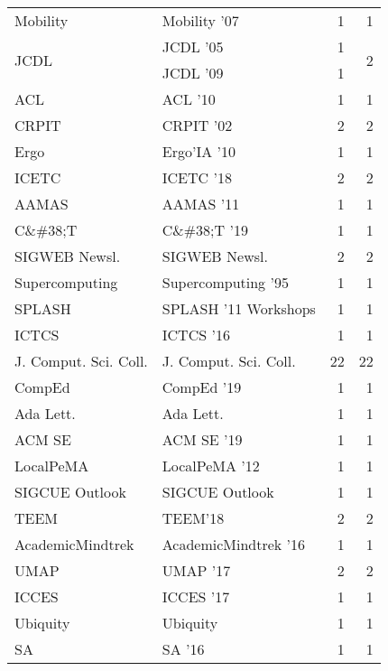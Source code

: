 \begin{table*}[t]
\begin{tabular}{llrr}
\multirow{1}{*}{Mobility } & Mobility '07 & 1 & \multirow{1}{*}{1}\\
\multirow{2}{*}{JCDL } & JCDL '05 & 1 & \multirow{2}{*}{2}\\
& JCDL '09 & 1 &\\
\multirow{1}{*}{ACL } & ACL '10 & 1 & \multirow{1}{*}{1}\\
\multirow{1}{*}{CRPIT } & CRPIT '02 & 2 & \multirow{1}{*}{2}\\
\multirow{1}{*}{Ergo} & Ergo'IA '10 & 1 & \multirow{1}{*}{1}\\
\multirow{1}{*}{ICETC } & ICETC '18 & 2 & \multirow{1}{*}{2}\\
\multirow{1}{*}{AAMAS } & AAMAS '11 & 1 & \multirow{1}{*}{1}\\
\multirow{1}{*}{C\&\#38;T } & C\&\#38;T '19 & 1 & \multirow{1}{*}{1}\\
\multirow{1}{*}{SIGWEB Newsl.} & SIGWEB Newsl. & 2 & \multirow{1}{*}{2}\\
\multirow{1}{*}{Supercomputing } & Supercomputing '95 & 1 & \multirow{1}{*}{1}\\
\multirow{1}{*}{SPLASH } & SPLASH '11 Workshops & 1 & \multirow{1}{*}{1}\\
\multirow{1}{*}{ICTCS } & ICTCS '16 & 1 & \multirow{1}{*}{1}\\
\multirow{1}{*}{J. Comput. Sci. Coll.} & J. Comput. Sci. Coll. & 22 & \multirow{1}{*}{22}\\
\multirow{1}{*}{CompEd } & CompEd '19 & 1 & \multirow{1}{*}{1}\\
\multirow{1}{*}{Ada Lett.} & Ada Lett. & 1 & \multirow{1}{*}{1}\\
\multirow{1}{*}{ACM SE } & ACM SE '19 & 1 & \multirow{1}{*}{1}\\
\multirow{1}{*}{LocalPeMA } & LocalPeMA '12 & 1 & \multirow{1}{*}{1}\\
\multirow{1}{*}{SIGCUE Outlook} & SIGCUE Outlook & 1 & \multirow{1}{*}{1}\\
\multirow{1}{*}{TEEM} & TEEM'18 & 2 & \multirow{1}{*}{2}\\
\multirow{1}{*}{AcademicMindtrek } & AcademicMindtrek '16 & 1 & \multirow{1}{*}{1}\\
\multirow{1}{*}{UMAP } & UMAP '17 & 2 & \multirow{1}{*}{2}\\
\multirow{1}{*}{ICCES } & ICCES '17 & 1 & \multirow{1}{*}{1}\\
\multirow{1}{*}{Ubiquity} & Ubiquity & 1 & \multirow{1}{*}{1}\\
\multirow{1}{*}{SA } & SA '16 & 1 & \multirow{1}{*}{1}\\

\end{tabular}
\end{table*}
